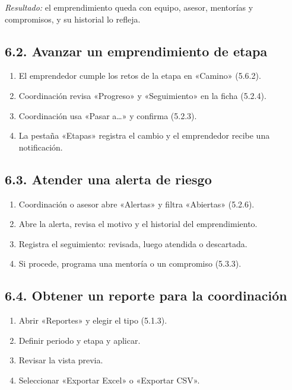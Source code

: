 \documentclass[12pt,letterpaper]{article}
\begin{document}
\textit{Resultado:} el emprendimiento queda con equipo, asesor, mentorías y compromisos, y su historial lo refleja.

\subsection*{6.2. Avanzar un emprendimiento de etapa}


\begin{enumerate}
\item El emprendedor cumple los retos de la etapa en «Camino» (5.6.2).
\item Coordinación revisa «Progreso» y «Seguimiento» en la ficha (5.2.4).
\item Coordinación usa «Pasar a\ldots{}» y confirma (5.2.3).
\item La pestaña «Etapas» registra el cambio y el emprendedor recibe una notificación.
\end{enumerate}

\subsection*{6.3. Atender una alerta de riesgo}


\begin{enumerate}
\item Coordinación o asesor abre «Alertas» y filtra «Abiertas» (5.2.6).
\item Abre la alerta, revisa el motivo y el historial del emprendimiento.
\item Registra el seguimiento: revisada, luego atendida o descartada.
\item Si procede, programa una mentoría o un compromiso (5.3.3).
\end{enumerate}

\subsection*{6.4. Obtener un reporte para la coordinación}


\begin{enumerate}
\item Abrir «Reportes» y elegir el tipo (5.1.3).
\item Definir periodo y etapa y aplicar.
\item Revisar la vista previa.
\item Seleccionar «Exportar Excel» o «Exportar CSV».
\end{enumerate}
\end{document}
